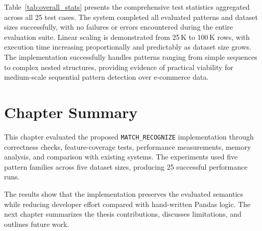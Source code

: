 Table~\ref{tab:overall_stats} presents the comprehensive test
statistics aggregated across all 25 test cases.  The system completed
all evaluated patterns and dataset sizes successfully, with no
failures or errors encountered during the entire evaluation suite.
Linear scaling is demonstrated from 25\,K to 100\,K rows, with
execution time increasing proportionally and predictably as dataset
size grows.  The implementation successfully handles patterns ranging
from simple sequences to complex nested structures, providing evidence
of practical viability for medium-scale sequential pattern detection
over e-commerce data.

\section{Chapter Summary}
\label{sec:eval-summary}

This chapter evaluated the proposed \texttt{MATCH\_RECOGNIZE}
implementation through correctness checks, feature-coverage tests,
performance measurements, memory analysis, and comparison with
existing systems.  The experiments used five pattern families across
five dataset sizes, producing 25 successful performance runs.

The results show that the implementation preserves the evaluated
semantics while reducing developer effort compared with hand-written
Pandas logic.  The next chapter summarizes the thesis contributions,
discusses limitations, and outlines future work.
